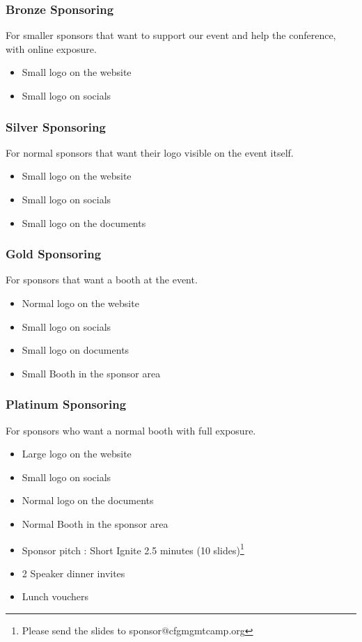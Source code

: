 \begin{frame}
\frametitle{Bronze Sponsoring}
For smaller sponsors that want to support our event and help the conference, with online exposure.
\begin{itemize}
	\item<+->
	Small logo on the website
	\item<+->
	Small logo on socials
	\end{itemize}
\end{frame}

\begin{frame}
\frametitle{Silver Sponsoring}
For normal sponsors that want their logo visible on the event itself.
\begin{itemize}
	\item<+->
	Small logo on the website
	\item<+->
	Small logo on socials
	\item<+->
	Small logo on the documents
\end{itemize}
\end{frame}

\begin{frame}
\frametitle{Gold Sponsoring}
For sponsors that want a booth at the event.
\begin{itemize}
	\item<+->
	Normal logo on the website
	\item<+->
	Small logo on socials
	\item<+->
	Small logo on documents
	\item<+->
	Small Booth in the sponsor area
\end{itemize}
\end{frame}

\begin{frame}
\frametitle{Platinum Sponsoring}
For sponsors who want a normal booth with full exposure.
\begin{itemize}
	\item<+->
	Large logo on the website
	\item<+->
	Small logo on socials
	\item<+->
	Normal logo on the documents
	\item<+->
	Normal Booth in the sponsor area
	\item<+->
	Sponsor pitch : Short Ignite 2.5 minutes (10 slides)\footnote{Please send the slides to sponsor@cfgmgmtcamp.org}
	\item<+->
	2 Speaker dinner invites
	\item<+->
	Lunch vouchers
\end{itemize}
\end{frame}

